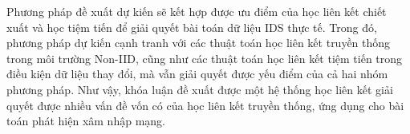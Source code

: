 Phương pháp đề xuất dự kiến sẽ kết hợp được ưu điểm của học liên kết chiết xuất và học tiệm tiến để giải quyết bài toán dữ liệu IDS thực tế. Trong đó, phương pháp dự kiến cạnh tranh với các thuật toán học liên kết truyền thống trong môi trường Non-IID, cũng như các thuật toán học liên kết tiệm tiến trong điều kiện dữ liệu thay đổi, mà vẫn giải quyết được yếu điểm của cả hai nhóm phương pháp. Như vậy, khóa luận đề xuất được một hệ thống học liên kết giải quyết được nhiều vấn đề vốn có của học liên kết truyền thống, ứng dụng cho bài toán phát hiện xâm nhập mạng.